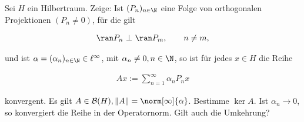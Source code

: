 \begin{exercise}

Sei $H$ ein Hilbertraum.
Zeige:
Ist $(P_n)_{n \in \N}$ eine Folge von orthogonalen Projektionen $(P_n \neq 0)$, für die gilt

\begin{align*}
  \ran P_n ~\bot~ \ran P_m, \qquad n \neq m,
\end{align*}

und ist $\alpha = (\alpha_n)_{n \in \N} \in \ell^{\infty}$, mit $\alpha_n \neq 0, n \in \N$, so ist für jedes $x \in H$ die Reihe

\begin{align*}
  Ax := \sum_{n=1}^{\infty} \alpha_n P_n x
\end{align*}

konvergent.
Es gilt $A \in \mathcal{B}(H), \|A\| = \norm[\infty]{\alpha}$.
Bestimme $\ker A$. Ist $\alpha_n \to 0$, so konvergiert die Reihe in der Operatornorm.
Gilt auch die Umkehrung?

\end{exercise}

